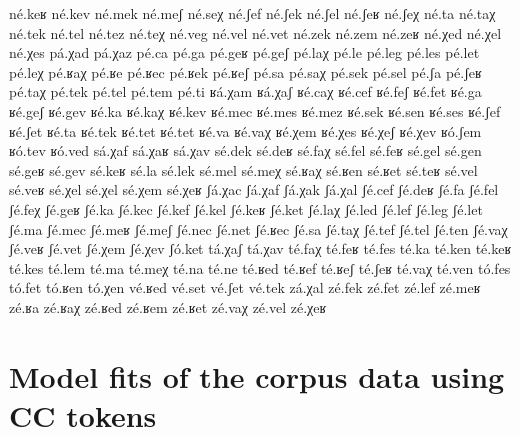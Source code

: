 \begin{multicols}{4}
\begin{exe}[(999)]
\ex né.keʁ
\ex né.kev
\ex né.mek
\ex né.meʃ
\ex né.seχ
\ex né.ʃef
\ex né.ʃek
\ex né.ʃel
\ex né.ʃeʁ
\ex né.ʃeχ
\ex né.ta
\ex né.taχ
\ex né.tek
\ex né.tel
\ex né.tez
\ex né.teχ
\ex né.veg
\ex né.vel
\ex né.vet
\ex né.zek
\ex né.zem
\ex né.zeʁ
\ex né.χed
\ex né.χel
\ex né.χes
\ex pá.χad
\ex pá.χaz
\ex pé.ca
\ex pé.ga
\ex pé.geʁ
\ex pé.geʃ
\ex pé.laχ
\ex pé.le
\ex pé.leg
\ex pé.les
\ex pé.let
\ex pé.leχ
\ex pé.ʁaχ
\ex pé.ʁe
\ex pé.ʁec
\ex pé.ʁek
\ex pé.ʁeʃ
\ex pé.sa
\ex pé.saχ
\ex pé.sek
\ex pé.sel
\ex pé.ʃa
\ex pé.ʃeʁ
\ex pé.taχ
\ex pé.tek
\ex pé.tel
\ex pé.tem
\ex pé.ti
\ex ʁá.χam
\ex ʁá.χaʃ
\ex ʁé.caχ
\ex ʁé.cef
\ex ʁé.feʃ
\ex ʁé.fet
\ex ʁé.ga
\ex ʁé.geʃ
\ex ʁé.gev
\ex ʁé.ka
\ex ʁé.kaχ
\ex ʁé.kev
\ex ʁé.mec
\ex ʁé.mes
\ex ʁé.mez
\ex ʁé.sek
\ex ʁé.sen
\ex ʁé.ses
\ex ʁé.ʃef
\ex ʁé.ʃet
\ex ʁé.ta
\ex ʁé.tek
\ex ʁé.tet
\ex ʁé.tet
\ex ʁé.va
\ex ʁé.vaχ
\ex ʁé.χem
\ex ʁé.χes
\ex ʁé.χeʃ
\ex ʁé.χev
\ex ʁó.ʃem
\ex ʁó.tev
\ex ʁó.ved
\ex sá.χaf
\ex sá.χaʁ
\ex sá.χav
\ex sé.dek
\ex sé.deʁ
\ex sé.faχ
\ex sé.fel
\ex sé.feʁ
\ex sé.gel
\ex sé.gen
\ex sé.geʁ
\ex sé.gev
\ex sé.keʁ
\ex sé.la
\ex sé.lek
\ex sé.mel
\ex sé.meχ
\ex sé.ʁaχ
\ex sé.ʁen
\ex sé.ʁet
\ex sé.teʁ
\ex sé.vel
\ex sé.veʁ
\ex sé.χel
\ex sé.χel
\ex sé.χem
\ex sé.χeʁ
\ex ʃá.χac
\ex ʃá.χaf
\ex ʃá.χak
\ex ʃá.χal
\ex ʃé.cef
\ex ʃé.deʁ
\ex ʃé.fa
\ex ʃé.fel
\ex ʃé.feχ
\ex ʃé.geʁ
\ex ʃé.ka
\ex ʃé.kec
\ex ʃé.kef
\ex ʃé.kel
\ex ʃé.keʁ
\ex ʃé.ket
\ex ʃé.laχ
\ex ʃé.led
\ex ʃé.lef
\ex ʃé.leg
\ex ʃé.let
\ex ʃé.ma
\ex ʃé.mec
\ex ʃé.meʁ
\ex ʃé.meʃ
\ex ʃé.nec
\ex ʃé.net
\ex ʃé.ʁec
\ex ʃé.sa
\ex ʃé.taχ
\ex ʃé.tef
\ex ʃé.tel
\ex ʃé.ten
\ex ʃé.vaχ
\ex ʃé.veʁ
\ex ʃé.vet
\ex ʃé.χem
\ex ʃé.χev
\ex ʃó.ket
\ex tá.χaʃ
\ex tá.χav
\ex té.faχ
\ex té.feʁ
\ex té.fes
\ex té.ka
\ex té.ken
\ex té.keʁ
\ex té.kes
\ex té.lem
\ex té.ma
\ex té.meχ
\ex té.na
\ex té.ne
\ex té.ʁed
\ex té.ʁef
\ex té.ʁeʃ
\ex té.ʃeʁ
\ex té.vaχ
\ex té.ven
\ex tó.fes
\ex tó.fet
\ex tó.ʁen
\ex tó.χen
\ex vé.ʁed
\ex vé.set
\ex vé.ʃet
\ex vé.tek
\ex zá.χal
\ex zé.fek
\ex zé.fet
\ex zé.lef
\ex zé.meʁ
\ex zé.ʁa
\ex zé.ʁaχ
\ex zé.ʁed
\ex zé.ʁem
\ex zé.ʁet
\ex zé.vaχ
\ex zé.vel
\ex zé.χeʁ
\end{exe}
\end{multicols}

\chapter{Model fits of the corpus data using CC tokens}\label{appendix:c}

